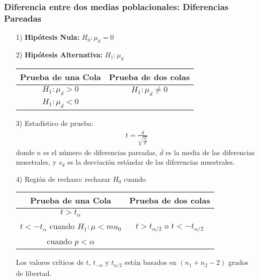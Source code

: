 \documentclass[a4paper]{report} %
\begin{document}
\subsubsection{Diferencia entre dos medias poblacionales: Diferencias Pareadas}

\begin{itemize}
\item[1) ] \textbf{Hip\'otesis Nula:} $H_{0}:\mu_{d}=0$
\item[2) ] \textbf{Hip\'otesis Alternativa: } $H_{1}:\mu_{d}$
\begin{center}
\begin{tabular}{cc}\hline
\textbf{Prueba de una Cola} & \textbf{Prueba de dos colas}\\\hline
$H_{1}:\mu_{d}>0$ & $H_{1}:\mu_{d}\neq 0$\\ 
$H_{1}:\mu_{d}<0$&\\
\end{tabular}
\end{center}

\item[3) ] Estad\'istico de prueba:
\begin{eqnarray}
t=\frac{\overline{d}}{\sqrt{\frac{s_{d}^{2}}{n}}}
\end{eqnarray}
donde $n$ es el n\'umero de diferencias pareadas, $\overline{d}$ es la media de las diferencias muestrales, y $s_{d}$ es la desviaci\'on est\'andar de las diferencias muestrales.
\item[4) ] Regi\'on de rechazo: rechazar $H_{0}$ cuando
\begin{center}
\begin{tabular}{cc}\hline
\textbf{Prueba de una Cola} & \textbf{Prueba de dos colas}\\\hline
$t>t_{\alpha}$ & \\
$t<-t_{\alpha}$ cuando $H_{1}:\mu<mu_{0}$&$t>t_{\alpha/2}$ o $t<-t_{\alpha/2}$\\
 cuando $p<\alpha$&\\
\end{tabular}
\end{center}
Los valores cr\'iticos de $t$, $t_{-\alpha}$ y $t_{\alpha/2}$ est\'an basados en $\left(n_{1}+n_{2}-2\right)$ grados de libertad.
\end{itemize}
\end{document}
